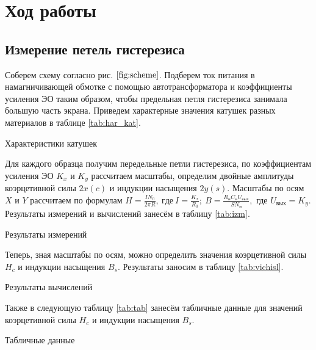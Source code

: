 \documentclass[12pt,a4paper]{article}
\begin{document}
\section*{Ход работы}

\subsection*{Измерение петель гистерезиса}

Соберем схему согласно рис. $\ref{fig:scheme}$. Подберем ток питания в намагничивающей обмотке с помощью автотрансформатора и коэффициенты усиления ЭО таким образом, чтобы предельная петля гистерезиса занимала большую часть экрана. Приведем характерные значения катушек разных материалов в таблице \ref{tab:har_kat}.

\begin{table}[H]
	\caption{Характеристики катушек}
	
	\label{tab:har_kat}
\end{table}


Для каждого образца получим передельные петли гистерезиса, по коэффициентам усиления ЭО $K_x$ и $K_y$ рассчитаем масштабы, определим двойные амплитуды коэрцетивной силы $ 2x(c) $ и индукции насыщения $ 2y(s) $. Масштабы по осям $ X $ и $ Y $ рассчитаем по формулам 
$H=\frac{IN_0}{2\pi R},\ где\ I=\frac{K_x}{R_0};\ B=\frac{R_\text{и}C_\text{и}U_{\text{вых}}}{SN_\text{и}},$ где $U_{\text{вых}}=K_y$. Результаты измерений и вычислений занесём в таблицу \ref{tab:izm}.

\begin{table}[H]
    \caption{Результаты измерений}
    
	\label{tab:izm}
\end{table}

Теперь, зная масштабы по осям, можно определить значения коэрцетивной силы $ H_c $
и индукции насыщения $ B_s $. Результаты заносим в таблицу \ref{tab:vichisl}.

\begin{table}[H]
    \caption{Результаты вычислений}
    
	\label{tab:vichisl}
\end{table}

Также в следующую таблицу \ref{tab:tab} занесём табличные данные для значений коэрцетивной силы $ H_c $ и индукции насыщения $ B_s $.

\begin{table}[H]
    \caption{Табличные данные}
    
	\label{tab:tab}
\end{table}
\end{document}

